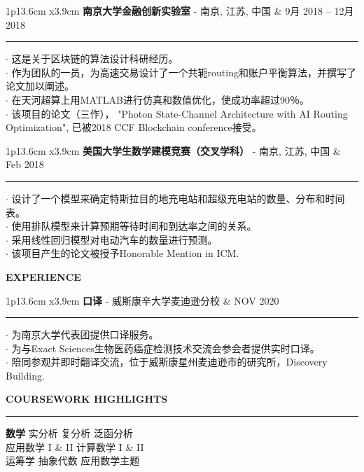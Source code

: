 \documentclass[UTF8,A4]{ctexart}
\newcommand{\cvsection}[1]
{
	\begin{center}
		\large\textcolor{sectcol}{\textbf{#1}}
	\end{center}
}
\newcommand{\cvevent}[3]
{

\begin{tabular*}{1\textwidth}{p{13.6cm}  x{3.9cm}}
	\textbf{#2} - \textcolor{bgcol}{#3} &   \vspace{2.5pt}\textcolor{sectcol}{#1}
\end{tabular*}

\vspace{-8pt}
\textcolor{softcol}{\hrule}
\vspace{6pt}


}
\begin{document}
\cvevent{9月 2018 – 12月 2018}
        {南京大学金融创新实验室}
        {南京, 江苏, 中国}

        $\cdot$ 这是关于区块链的算法设计科研经历。\\
        $\cdot$ 作为团队的一员，为高速交易设计了一个共轭routing和账户平衡算法，并撰写了论文加以阐述。\\
        $\cdot$ 在天河超算上用MATLAB进行仿真和数值优化，使成功率超过90％。\\
        $\cdot$ 该项目的论文（三作）， 
                "Photon State-Channel Architecture with AI Routing Optimization", 
                已被2018 CCF Blockchain conference接受。\\

\cvevent{Feb 2018}
        {美国大学生数学建模竞赛（交叉学科）}
        {南京, 江苏, 中国}

        $\cdot$ 设计了一个模型来确定特斯拉目的地充电站和超级充电站的数量、分布和时间表。\\
        $\cdot$ 使用排队模型来计算预期等待时间和到达率之间的关系。\\
        $\cdot$ 采用线性回归模型对电动汽车的数量进行预测。\\
        $\cdot$ 该项目产生的论文被授予Honorable Mention in ICM.\\



\cvsection{EXPERIENCE}
\cvevent{NOV 2020}
        {口译}
        {威斯康辛大学麦迪逊分校}

        $\cdot$ 为南京大学代表团提供口译服务。\\
        $\cdot$ 为与Exact Sciences生物医药癌症检测技术交流会参会者提供实时口译。\\
        $\cdot$ 陪同参观并即时翻译交流，位于威斯康星州麦迪逊市的研究所，Discovery Building.\\


\newpage


\cvsection{COURSEWORK HIGHLIGHTS}
\vspace{-18pt}
\textcolor{softcol}{\hrule}
\vspace{6pt}

\textbf{数学}
实分析 \textbullet{} 复分析 \textbullet{} 泛函分析 \\
应用数学 I \& II \textbullet{} 计算数学 I \& II \\
运筹学 \textbullet{} 抽象代数 \textbullet{} 应用数学主题\\
\end{document}
